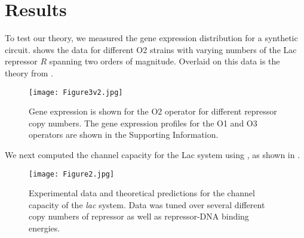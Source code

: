 \section{Results}

To test our theory, we measured the gene expression distribution for a synthetic
circuit. \fref[figFullProfile] shows the data for different O2 strains with
varying numbers of the Lac repressor $R$ spanning two orders of magnitude.
Overlaid on this data is the theory from
\eref[eqGeneExpressionDistributionFastRates].

\begin{figure}[h!]
	\centering \texttt{[image: Figure3v2.jpg]} 
	\caption{ Gene expression is shown for the O2 operator for different repressor copy numbers. The gene expression profiles for the O1 and O3 operators are shown in the Supporting Information.}
	\label{figFullProfile}
\end{figure}

We next computed the channel capacity for the Lac system using
\eref[eqChannelCapacity], as shown in \fref[figChannelCapacity].

\begin{figure}[h!]
	\centering \texttt{[image: Figure2.jpg]} 
	\caption{ Experimental data and theoretical predictions for the channel capacity of the \textit{lac} system. Data was tuned over several different copy numbers of repressor as well as repressor-DNA binding energies.}
	\label{figChannelCapacity}
\end{figure}